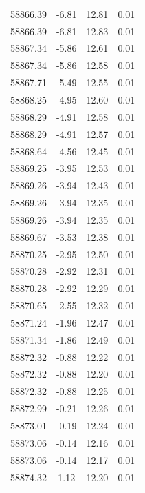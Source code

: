 \begin{longtable}{|c|c|c|c|}
 58866.39 &   -6.81 &       12.81 &          0.01 \\
 58866.39 &   -6.81 &       12.83 &          0.01 \\
 58867.34 &   -5.86 &       12.61 &          0.01 \\
 58867.34 &   -5.86 &       12.58 &          0.01 \\
 58867.71 &   -5.49 &       12.55 &          0.01 \\
 58868.25 &   -4.95 &       12.60 &          0.01 \\
 58868.29 &   -4.91 &       12.58 &          0.01 \\
 58868.29 &   -4.91 &       12.57 &          0.01 \\
 58868.64 &   -4.56 &       12.45 &          0.01 \\
 58869.25 &   -3.95 &       12.53 &          0.01 \\
 58869.26 &   -3.94 &       12.43 &          0.01 \\
 58869.26 &   -3.94 &       12.35 &          0.01 \\
 58869.26 &   -3.94 &       12.35 &          0.01 \\
 58869.67 &   -3.53 &       12.38 &          0.01 \\
 58870.25 &   -2.95 &       12.50 &          0.01 \\
 58870.28 &   -2.92 &       12.31 &          0.01 \\
 58870.28 &   -2.92 &       12.29 &          0.01 \\
 58870.65 &   -2.55 &       12.32 &          0.01 \\
 58871.24 &   -1.96 &       12.47 &          0.01 \\
 58871.34 &   -1.86 &       12.49 &          0.01 \\
 58872.32 &   -0.88 &       12.22 &          0.01 \\
 58872.32 &   -0.88 &       12.20 &          0.01 \\
 58872.32 &   -0.88 &       12.25 &          0.01 \\
 58872.99 &   -0.21 &       12.26 &          0.01 \\
 58873.01 &   -0.19 &       12.24 &          0.01 \\
 58873.06 &   -0.14 &       12.16 &          0.01 \\
 58873.06 &   -0.14 &       12.17 &          0.01 \\
 58874.32 &    1.12 &       12.20 &          0.01 \\

\end{longtable}
